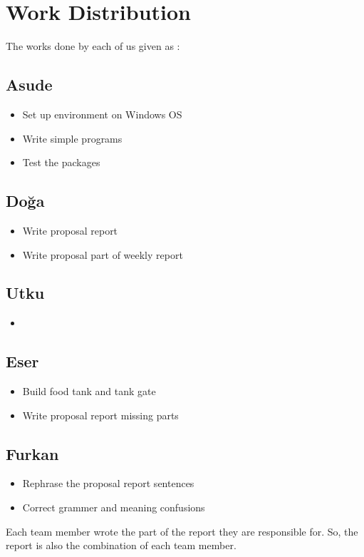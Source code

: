 \section{Work Distribution}
\label{sec:workDistribution}
The works done by each of us given as :
\subsection{Asude}
\begin{itemize}
    \item Set up environment on Windows OS
    \item Write simple programs
    \item Test the packages
\end{itemize}

\subsection{Doğa}
\begin{itemize}
    \item Write proposal report
    \item Write proposal part of weekly report
\end{itemize}


\subsection{Utku}
\begin{itemize}
    \item 
\end{itemize}


\subsection{Eser}
\begin{itemize}
    \item Build food tank and tank gate
    \item Write proposal report missing parts
\end{itemize}


\subsection{Furkan}
\begin{itemize}
    \item Rephrase the proposal report sentences
    \item Correct grammer and meaning confusions
\end{itemize}

Each team member wrote the part of the report they are responsible for. So, the report is also the combination of each team member.
